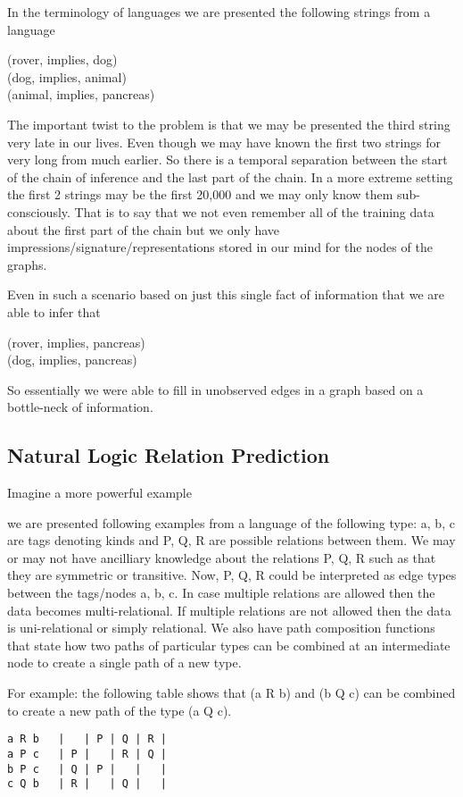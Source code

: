 \documentclass[11pt]{article}
\begin{document}
In the terminology of languages we are presented the following strings
from a language

(rover, implies, dog) \\
(dog, implies, animal) \\
(animal, implies, pancreas)

The important twist to the problem is that we may be presented the
third string very late in our lives.  Even though we may have known
the first two strings for very long from much earlier.  So there is a
temporal separation between the start of the chain of inference and
the last part of the chain.  In a more extreme setting the first 2
strings may be the first 20,000 and we may only know them
sub-consciously.  That is to say that we not even remember all of the
training data about the first part of the chain but we only have
impressions/signature/representations stored in our mind for the nodes
of the graphs.

Even in such a scenario based on just this single fact of information
that we are able to infer that

(rover, implies, pancreas) \\
(dog, implies, pancreas)

So essentially we were able to fill in unobserved edges in a
graph based on a bottle-neck of information.

\subsection{Natural Logic Relation Prediction}
\label{sec:natur-logic-relat}
Imagine a more powerful example

we are presented following examples from a language of the following type:
a, b, c are tags denoting kinds and P, Q, R are possible relations
between them. We may or may not have ancilliary knowledge about the
relations P, Q, R such as that they are symmetric or transitive.
Now, P, Q, R could be interpreted as edge types between the tags/nodes
a, b, c. In case multiple relations are allowed then the data becomes
multi-relational. If multiple relations are not allowed then the data
is uni-relational or simply relational. We also have path composition
functions that state how two paths of particular types can be combined
at an intermediate node to create a single path of a new type.

For example: the following table shows that (a R b) and (b Q c) can be
combined to create a new path of the type (a Q c).
\begin{verbatim}
a R b   |   | P | Q | R |
a P c   | P |   | R | Q |
b P c   | Q | P |   |   |
c Q b   | R |   | Q |   |
\end{verbatim}
\end{document}
